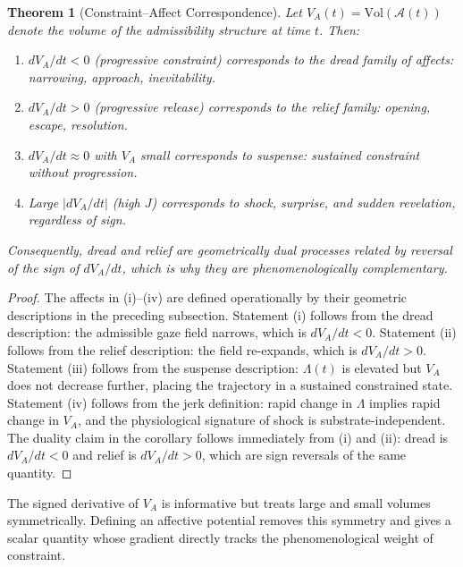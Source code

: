 \documentclass[12pt, a4paper]{article}
\theoremstyle{plain}
\newtheorem{theorem}{Theorem}[section]
\theoremstyle{definition}
\theoremstyle{remark}
\newcommand{\A}{\mathcal{A}}
\newcommand{\jerk}{J}
\begin{document}
\begin{theorem}[Constraint--Affect Correspondence]
\label{thm:constraint_affect}
  Let $V_A(t) = \mathrm{Vol}(\A(t))$ denote the volume of
  the admissibility structure at time $t$. Then:
  \begin{enumerate}[label=\emph{(\roman*)}]
    \item $dV_A/dt < 0$ (progressive constraint) corresponds
      to the dread family of affects: narrowing, approach,
      inevitability.
    \item $dV_A/dt > 0$ (progressive release) corresponds
      to the relief family: opening, escape, resolution.
    \item $dV_A/dt \approx 0$ with $V_A$ small corresponds
      to suspense: sustained constraint without progression.
    \item Large $|dV_A/dt|$ (high $\jerk$) corresponds to
      shock, surprise, and sudden revelation, regardless
      of sign.
  \end{enumerate}
  Consequently, dread and relief are geometrically dual
  processes related by reversal of the sign of $dV_A/dt$,
  which is why they are phenomenologically complementary.
\end{theorem}

\begin{proof}
  The affects in (i)--(iv) are defined operationally by
  their geometric descriptions in the preceding subsection.
  Statement (i) follows from the dread description: the
  admissible gaze field narrows, which is $dV_A/dt < 0$.
  Statement (ii) follows from the relief description: the
  field re-expands, which is $dV_A/dt > 0$. Statement (iii)
  follows from the suspense description: $\Lambda(t)$ is
  elevated but $V_A$ does not decrease further, placing the
  trajectory in a sustained constrained state. Statement
  (iv) follows from the jerk definition: rapid change in
  $\Lambda$ implies rapid change in $V_A$, and the
  physiological signature of shock is substrate-independent.
  The duality claim in the corollary follows immediately
  from (i) and (ii): dread is $dV_A/dt < 0$ and relief is
  $dV_A/dt > 0$, which are sign reversals of the same
  quantity.
\end{proof}

The signed derivative of $V_A$ is informative but treats
large and small volumes symmetrically. Defining an
affective potential removes this symmetry and gives a
scalar quantity whose gradient directly tracks the
phenomenological weight of constraint.
\end{document}
